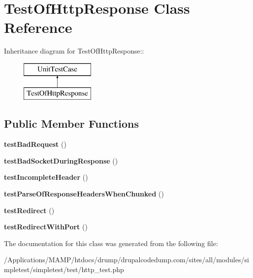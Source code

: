 \hypertarget{class_test_of_http_response}{
\section{TestOfHttpResponse Class Reference}
\label{class_test_of_http_response}
}
Inheritance diagram for TestOfHttpResponse::\begin{figure}[H]
\begin{center}
\leavevmode
\includegraphics[height=2cm]{class_test_of_http_response}
\end{center}
\end{figure}
\subsection*{Public Member Functions}
\begin{DoxyCompactItemize}
\item 
\hypertarget{class_test_of_http_response_a2108907c56cfa16cca541ecdefc2a9bf}{
{\bfseries testBadRequest} ()}
\label{class_test_of_http_response_a2108907c56cfa16cca541ecdefc2a9bf}

\item 
\hypertarget{class_test_of_http_response_a3109e189ab24665a2af9b2a0b062188e}{
{\bfseries testBadSocketDuringResponse} ()}
\label{class_test_of_http_response_a3109e189ab24665a2af9b2a0b062188e}

\item 
\hypertarget{class_test_of_http_response_afd61400d9b87b144b873c3a3b7e62a41}{
{\bfseries testIncompleteHeader} ()}
\label{class_test_of_http_response_afd61400d9b87b144b873c3a3b7e62a41}

\item 
\hypertarget{class_test_of_http_response_a1d63ddcf03fea6df5926faa5351cde89}{
{\bfseries testParseOfResponseHeadersWhenChunked} ()}
\label{class_test_of_http_response_a1d63ddcf03fea6df5926faa5351cde89}

\item 
\hypertarget{class_test_of_http_response_aa506a8e502771dc0a912ff673d0cba99}{
{\bfseries testRedirect} ()}
\label{class_test_of_http_response_aa506a8e502771dc0a912ff673d0cba99}

\item 
\hypertarget{class_test_of_http_response_a4981d6a27602e70628ff5b159718a447}{
{\bfseries testRedirectWithPort} ()}
\label{class_test_of_http_response_a4981d6a27602e70628ff5b159718a447}

\end{DoxyCompactItemize}


The documentation for this class was generated from the following file:\begin{DoxyCompactItemize}
\item 
/Applications/MAMP/htdocs/drump/drupalcodedump.com/sites/all/modules/simpletest/simpletest/test/http\_\-test.php\end{DoxyCompactItemize}
